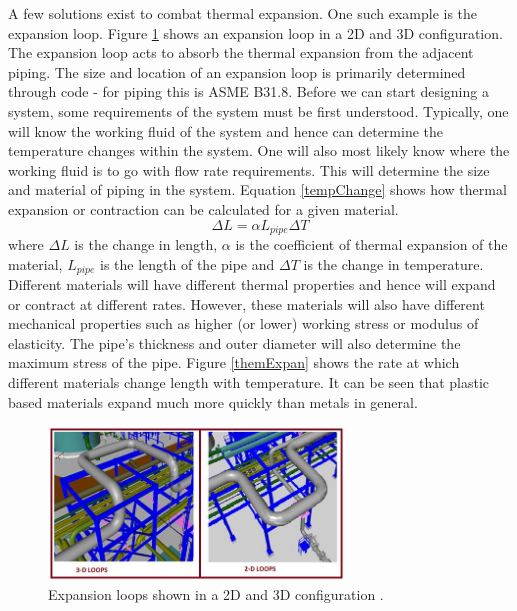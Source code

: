 A few solutions exist to combat thermal expansion. One such example is the expansion loop. Figure \ref{expLoop} shows an expansion loop in a 2D and 3D configuration. The expansion loop acts to absorb the thermal expansion from the adjacent piping. The size and location of an expansion loop is primarily determined through code - for piping this is ASME B31.8. Before we can start designing a system, some requirements of the system must be first understood. Typically, one will know the working fluid of the system and hence can determine the temperature changes within the system. One will also most likely know where the working fluid is to go with flow rate requirements. This will determine the size and material of piping in the system. Equation \eqref{tempChange} shows how thermal expansion or contraction can be calculated for a given material.
\begin{equation}\label{tempChange}
    \Delta L = \alpha L_{pipe} \Delta T 
\end{equation}
where $\Delta L$ is the change in length, $\alpha$ is the coefficient of thermal expansion of the material, $L_{pipe}$ is the length of the pipe and $\Delta T$ is the change in temperature. Different materials will have different thermal properties and hence will expand or contract at different rates. However, these materials will also have different mechanical properties such as higher (or lower) working stress or modulus of elasticity. The pipe's thickness and outer diameter will also determine the maximum stress of the pipe. Figure \ref{themExpan} shows the rate at which different materials change length with temperature. It can be seen that plastic based materials expand much more quickly than metals in general. 
\begin{figure}[H]
    \centering
    \includegraphics[width = 0.7\textwidth]{img/fig24.jpg}
    \caption{Expansion loops shown in a 2D and 3D configuration \cite{2d3d}.}
    \label{expLoop}
\end{figure}
